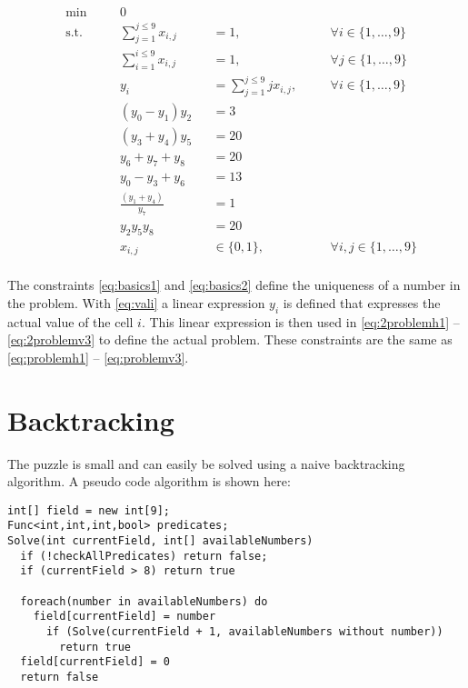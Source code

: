 \documentclass[parskip=half]{scrartcl}
\newcommand{\onetonine}{\{1,\ldots,9\}}
\begin{document}
\begin{align}
&\min \quad &&0 \\
& \text{s.t.} \quad 
&& \sum_{j=1}^{j\leq 9}x_{i,j}   &&= 1 		,&&\quad \forall i \in \onetonine \label{eq:basics1} \\
& && \sum_{i=1}^{i\leq 9}x_{i,j} 			&&=1  		,&&\quad \forall j \in \onetonine \label{eq:basics2} \\
& && y_i &&= \sum_{j=1}^{j\leq 9} jx_{i,j}  ,&&\quad \forall i \in \onetonine \label{eq:vali} \\
& && (y_0 - y_1) y_2  &&= 3 \label{eq:2problemh1} \\
& && (y_3 + y_4) y_5  &&= 20 \label{eq:2problemh2} \\
& && y_6  + y_7 + y_8 &&= 20 \label{eq:2problemh3} \\
& && y_0 - y_3 + y_6  &&= 13 \label{eq:2problemv1} \\
& && \frac{(y_1 + y_4)}{y_7} &&= 1 \label{eq:2problemv2} \\
& && y_2  y_5  y_8 &&= 20 \label{eq:2problemv3} \\
& && x_{i,j} 		&&\in \{0,1\} ,&& \quad \forall i,j \in \onetonine \\
\end{align}

The constraints \autoref{eq:basics1} and \autoref{eq:basics2} define the uniqueness of a number in the problem. With \autoref{eq:vali} a linear expression $y_i$ is defined that expresses the actual value of the cell $i$. This linear expression is then used in \autoref{eq:2problemh1} -- \autoref{eq:2problemv3} to define the actual problem. These constraints are the same as \autoref{eq:problemh1} -- \autoref{eq:problemv3}.

\clearpage
\section{Backtracking}
The puzzle is small and can easily be solved using a naive backtracking algorithm.
A pseudo code algorithm is shown here:
\begin{lstlisting}
int[] field = new int[9];
Func<int,int,int,bool> predicates;
Solve(int currentField, int[] availableNumbers) 
  if (!checkAllPredicates) return false;
  if (currentField > 8) return true
	
  foreach(number in availableNumbers) do
    field[currentField] = number
      if (Solve(currentField + 1, availableNumbers without number)) 
        return true	
  field[currentField] = 0
  return false

\end{lstlisting}
\end{document}
